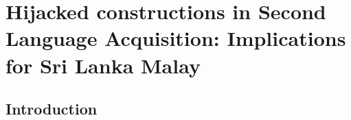  

\chapter[Hijacked constructions in L2 Acquisition]{Hijacked constructions in Second Language Acquisition: Implications for Sri Lanka Malay}

% 
% 


\section{Introduction}


